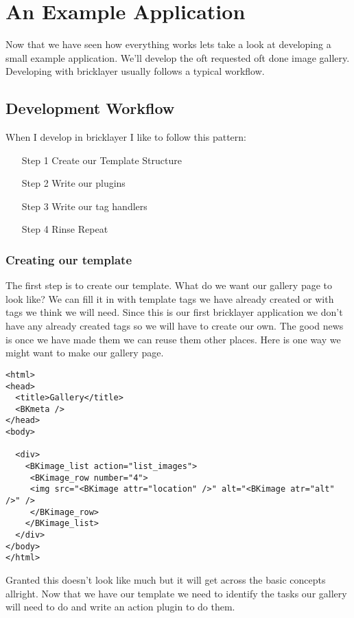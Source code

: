 \chapter{An Example Application}
Now that we have seen how everything works lets take a look at developing a small example application. We'll develop the oft requested oft done image gallery. Developing with bricklayer usually follows a typical workflow.
\section{Development Workflow}
When I develop in bricklayer I like to follow this pattern:
\begin{itemize}
\item[Step 1] Create our Template Structure
\item[Step 2] Write our plugins
\item[Step 3] Write our tag handlers
\item[Step 4] Rinse Repeat
\end{itemize}
\subsection{Creating our template}
The first step is to create our template. What do we want our gallery page to look like? We can fill it in with template tags we have already created or with tags we think we will need. Since this is our first bricklayer application we don't have any already created tags so we will have to create our own. The good news is once we have made them we can reuse them other places. Here is one way we might want to make our gallery page.
\newpage
\begin{verbatim}
<html>
<head>
  <title>Gallery</title>
  <BKmeta />
</head>
<body>
  
  <div>
    <BKimage_list action="list_images">
     <BKimage_row number="4">
     <img src="<BKimage attr="location" />" alt="<BKimage atr="alt" />" />
     </BKimage_row>
    </BKimage_list>
  </div>
</body>
</html>
\end{verbatim}
Granted this doesn't look like much but it will get across the basic concepts allright. Now that we have our template we need to identify the tasks our gallery will need to do and write an action plugin to do them.

